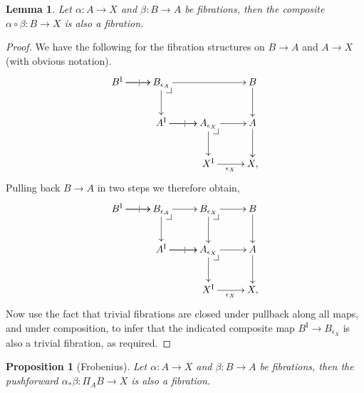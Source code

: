 \documentclass[12pt]{article}
\makeatletter
\newcommand{\pbcorner}[1][dr]{\save*!/#1-1.2pc/#1:(-1,1)@^{|-}\restore}
\newcommand{\ra}{\ensuremath{\rightarrow}}
\newcommand{\I}{\ensuremath{\mathrm{I}}}
\newtheorem{proposition}[theorem]{Proposition}
\newtheorem{lemma}[theorem]{Lemma}
\theoremstyle{remark}
\theoremstyle{definition}
\makeatother
\begin{document}
\begin{lemma}\label{lemma:fibrationscompose}
Let  $\alpha : A \ra X$ and $\beta: B\ra A$ be fibrations, then the composite $\alpha\circ\beta : B \ra X$ is also a fibration.
\end{lemma}
\begin{proof}
We have the following for the fibration structures on $B\ra A$ and $A\ra X$ (with obvious notation).
\begin{equation}\label{diagram:fibcomposition1}
\xymatrix{
B^\I \ar[r]|| \ar[r]  & B_{\epsilon_A} \ar[rr]  \ar[d] \pbcorner & & B \ar[d]\\
&A^\I \ar[r]|| \ar[r] & A_{\epsilon_X} \ar[d] \pbcorner \ar[r] & A \ar[d]\\
&& X^\I \ar[r]_{\epsilon_X} &  X,
}
\end{equation}
Pulling back $B\ra A$ in two steps we therefore obtain,
\begin{equation}\label{diagram:fibcomposition2}
\xymatrix{
B^\I \ar[r]|| \ar[r]   & B_{\epsilon_A} \ar[r]  \ar[d] \pbcorner & B_{\epsilon_X}  \ar[d] \pbcorner \ar[r] & B \ar[d]\\
&A^\I \ar[r]|| \ar[r]  & A_{\epsilon_X} \ar[d] \pbcorner \ar[r] & A \ar[d]\\
&& X^\I \ar[r]_{\epsilon_X} &  X,
}
\end{equation}
Now use the fact that trivial fibrations are closed under pullback along all maps, and under composition, to infer that the indicated composite map $B^\I \ra B_{\epsilon_X} $ is also a trivial fibration, as required.
\end{proof}


\begin{proposition}[Frobenius]\label{prop:Frobenius}
Let $\alpha : A \ra X$ and $\beta: B\ra A$  be fibrations, then the pushforward $\alpha_*\beta : \Pi_AB \ra X$ is also a fibration.
\end{proposition}
\end{document}
